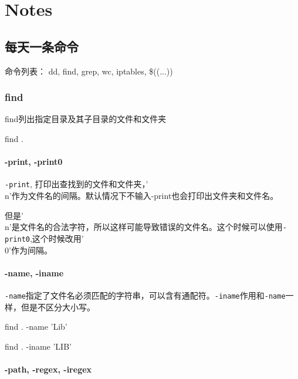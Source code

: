 \chapter{Notes}

\section{每天一条命令}
命令列表：
dd, find, grep, wc, iptables, \$((...)) 



\subsection{find}

find列出指定目录及其子目录的文件和文件夹

\begin{Bash}[查找当前目录及子目录的文件和文件夹]
find .
\end{Bash}


\subsubsection{-print, -print0}
\lstinline$-print$, 打印出查找到的文件和文件夹，'\\n'作为文件名的间隔。默认情况下不输入-print也会打印出文件夹和文件名。

但是'\\n'是文件名的合法字符，所以这样可能导致错误的文件名。这个时候可以使用\lstinline$-print0$,这个时候改用'\\0'作为间隔。

\subsubsection{-name, -iname}

\lstinline$-name$指定了文件名必须匹配的字符串，可以含有通配符。\lstinline$-iname$作用和\lstinline$-name$一样，但是不区分大小写。

\begin{Bash}[名字匹配指定的字符串]

find . -name 'Lib'

find . -iname 'LIB'

\end{Bash}


\subsubsection{ -path, -regex, -iregex}


